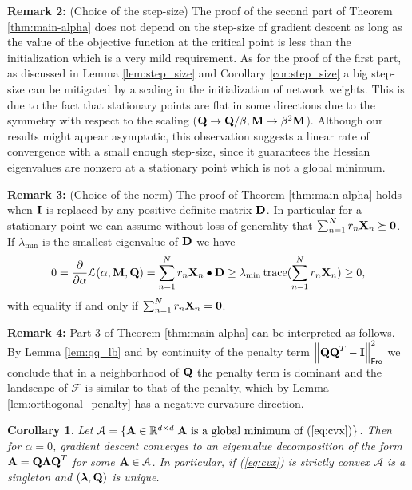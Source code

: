 \documentclass[11pt]{article}
\theoremstyle{plain}
\newtheorem{corollary}{Corollary}
\DeclareMathOperator*{\trace}{trace}
\def\R{\mathbb{R}}
\theoremstyle{plain}
\numberwithin{equation}{section}
\numberwithin{lemma}{section}
\numberwithin{theorem}{section}
\numberwithin{corollary}{section}
\numberwithin{observation}{section}
\numberwithin{definition}{section}
\numberwithin{example}{section}
\begin{document}
\textbf{Remark 2:} (Choice of the step-size) The proof of the second part of Theorem \ref{thm:main-alpha} does not depend on the step-size of gradient descent as long as the value of the objective function at the critical point is less than the initialization which is a very mild requirement. As for the proof of the first part, as discussed in Lemma \ref{lem:step_size} and Corollary \ref{cor:step_size} a big step-size can be mitigated by a scaling in the initialization of network weights. This is due to the fact that stationary points are flat in some directions due to the symmetry with respect to the scaling ($\Mx{Q} \rightarrow \Mx{Q}/\beta, \Mx{M} \rightarrow \beta^2 \Mx{M}$). Although our results might appear asymptotic, this observation suggests a linear rate of convergence with a small enough step-size, since it guarantees the Hessian eigenvalues are nonzero at a stationary point which is not a global minimum.

\textbf{Remark 3:} (Choice of the norm) The proof of Theorem \ref{thm:main-alpha} holds when $\Mx{I}$ is replaced by any positive-definite matrix $\Mx{D}$. In particular for a stationary point we can assume without loss of generality that $\sum_{n=1}^N r_n \Mx{X}_n \succeq \Mx{0}$. If $\lambda_{\min}$ is the smallest eigenvalue of $\Mx{D}$ we have
\[
0 = \frac{\partial}{\partial \alpha} \mathcal{L}(\alpha, \Mx{M},\Mx{Q}) = \sum_{n=1}^N r_n \Mx{X}_n \bullet \Mx{D} \geq \lambda_{\min} \trace(\sum_{n=1}^N r_n \Mx{X}_n) \geq 0,
\]
with equality if and only if $\sum_{n=1}^N r_n \Mx{X}_n = \Mx{0}$.

\textbf{Remark 4:} Part 3 of Theorem \ref{thm:main-alpha} can be interpreted as follows. By Lemma \ref{lem:qq_lb} and by continuity of the penalty term $\left\|\Mx{QQ}^T-\Mx{I} \right\|_{\sf Fro}^2$ we conclude that in a neighborhood of $\Mx{Q}$ the penalty term is dominant and the landscape of $\mathcal{F}$ is similar to that of the penalty, which by Lemma \ref{lem:orthogonal_penalty} has a negative curvature direction.

\begin{corollary} \label{cor:gd_svd}
Let $\mathcal{A}= \{\Mx{A} \in \R^{d \times d} | \Mx{A} \text{ is a global minimum of (\ref{eq:cvx})} \}$. Then for $\alpha = 0$, gradient descent converges to an eigenvalue decomposition of the form $\Mx{A} = \Mx{Q}\Mx{\Lambda}\Mx{Q}^T$ for some $\Mx{A} \in \mathcal{A}$. In particular, if (\ref{eq:cvx}) is strictly convex $\mathcal{A}$ is a singleton and $(\V{\lambda},\Mx{Q})$ is unique.
\end{corollary}
\end{document}
